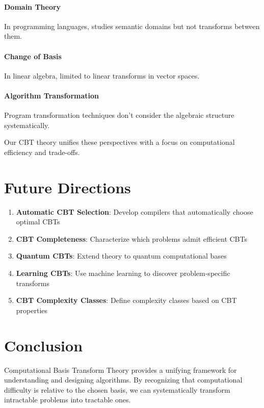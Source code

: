 \documentclass[12pt,a4paper]{article}
\theoremstyle{definition}
\begin{document}
\paragraph{Domain Theory} In programming languages, studies semantic domains but not transforms between them.

\paragraph{Change of Basis} In linear algebra, limited to linear transforms in vector spaces.

\paragraph{Algorithm Transformation} Program transformation techniques don't consider the algebraic structure systematically.

Our CBT theory unifies these perspectives with a focus on computational efficiency and trade-offs.

\section{Future Directions}

\begin{enumerate}
\item \textbf{Automatic CBT Selection}: Develop compilers that automatically choose optimal CBTs
\item \textbf{CBT Completeness}: Characterize which problems admit efficient CBTs
\item \textbf{Quantum CBTs}: Extend theory to quantum computational bases
\item \textbf{Learning CBTs}: Use machine learning to discover problem-specific transforms
\item \textbf{CBT Complexity Classes}: Define complexity classes based on CBT properties
\end{enumerate}

\section{Conclusion}

Computational Basis Transform Theory provides a unifying framework for understanding and designing algorithms. By recognizing that computational difficulty is relative to the chosen basis, we can systematically transform intractable problems into tractable ones.
\end{document}
